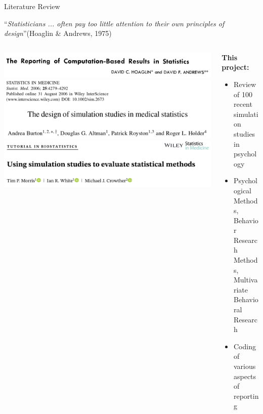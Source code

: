 \documentclass[english, 12pt, aspectratio=169]{beamer}
\begin{document}
\begin{frame}{Literature Review}
\begin{tcolorbox}[colframe=chineseBlue]
            ``\emph{Statisticians ... often pay too little attention to their own principles of design}''(Hoaglin \& Andrews, 1975)
          \end{tcolorbox}
          \vspace{-1em}
  \begin{columns}
    \begin{column}{0.5\textwidth}
      \begin{block}{}
          \centering
          \includegraphics[width = 0.8\linewidth,frame]{pics/hoaglin.png}
          \includegraphics[width = 0.8\linewidth,frame]{pics/burton.png}
          \includegraphics[width = 0.8\linewidth,frame]{pics/morris.png}
          \nocite{Hoaglin1975}
          \pause
      \end{block}
    \end{column}
    \begin{column}{0.5\textwidth}
      \begin{block}{}
      \textbf{This project:}
      \pause
        \begin{itemize}
          \item Review of \alert{100 recent simulation studies} in psychology
          \pause
          \item Psychological Methods, Behavior Research Methods, Multivariate Behavioral Research
          \pause
          \item Coding of various aspects of reporting
        \end{itemize}
      \end{block}
      \end{column}
    \end{columns}
\end{frame}
\end{document}
